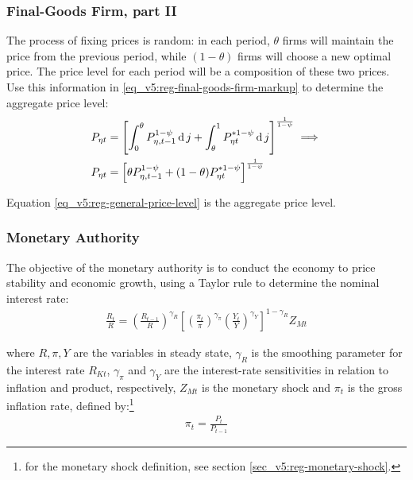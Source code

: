 \documentclass[../thesis.tex]{subfiles}
\begin{document}
\subsubsection*{Final-Goods Firm, part II}

The process of fixing prices is random: in each period, $\theta$ firms will maintain the price from the previous period, while $(1-\theta)$ firms will choose a new optimal price. The price level for each period will be a composition of these two prices. Use this information in \ref{eq_v5:reg-final-goods-firm-markup} to determine the aggregate price level:
\begin{align}
	P_{\eta t} & = \left[ \int_{0}^{\theta} P_{\eta, t-1}^{1-\psi} \operatorname{d} j + \int_{\theta}^{1} P_{\eta t}^{\ast 1-\psi} \operatorname{d} j \right]^{\frac{1}{1-\psi}}  \implies \nonumber \\
	P_{\eta t} & = \left[ \theta P_{\eta, t-1}^{1-\psi} + (1-\theta) P_{\eta t}^{\ast 1-\psi} \right]^\frac{1}{1-\psi} \label{eq_v5:reg-general-price-level}
\end{align}

Equation \ref{eq_v5:reg-general-price-level} is the aggregate price level.


\subsubsection{Monetary Authority}

The objective of the monetary authority is to conduct the economy to price stability and economic growth, using a Taylor rule \cite{taylor_discretion_1993} to determine the nominal interest rate:
\begin{align}
	\label{eq_v5:reg-monetary-policy}
	\frac{R_{t}}{R} =
	\left( \frac{R_{t-1}}{R} \right)^{\gamma_R}  \left[
	\left( \frac{\pi_t}{\pi} \right)^{\gamma_\pi}
	\left( \frac{Y_{t}}{Y} \right)^{\gamma_Y} \right]^{1-\gamma_R} Z_{Mt}
\end{align}

where $R, \pi, Y$ are the variables in steady state, $\gamma_R$ is the smoothing parameter for the interest rate $R_{Kt}$, $\gamma_\pi$ and $\gamma_Y$ are the interest-rate sensitivities in relation to inflation and product, respectively, $Z_{Mt}$ is the monetary shock and $\pi_t$ is the gross inflation rate, defined by:\footnote{for the monetary shock definition, see section \ref{sec_v5:reg-monetary-shock}.}
\begin{align}
	\pi_t = \frac{P_t}{P_{t-1}}
	\label{eq_v5:reg-gross-inflation-rate}
\end{align}
\end{document}
